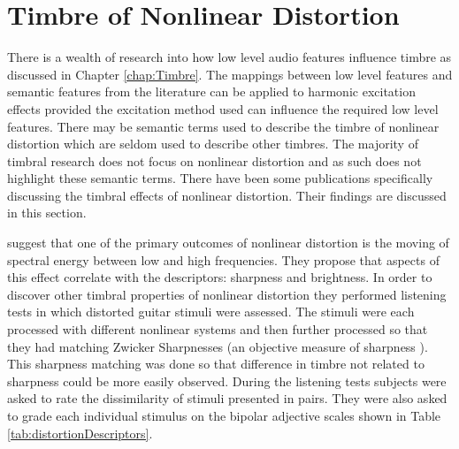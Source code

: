 \section{Timbre of Nonlinear Distortion}
\label{sec:Excitation-Timbre}
	There is a wealth of research into how low level audio features influence timbre as discussed in Chapter
	\ref{chap:Timbre}. The mappings between low level features and semantic features from the literature can be applied
	to harmonic excitation effects provided the excitation method used can influence the required low level features.
	There may be semantic terms used to describe the timbre of nonlinear distortion which are seldom used to describe
	other timbres. The majority of timbral research does not focus on nonlinear distortion and as such does not
	highlight these semantic terms. There have been some publications specifically discussing the timbral effects of
	nonlinear distortion. Their findings are discussed in this section.

	\citet{marui2005predicting} suggest that one of the primary outcomes of nonlinear distortion is the moving of
	spectral energy between low and high frequencies. They propose that aspects of this effect correlate with the
	descriptors: sharpness and brightness. In order to discover other timbral properties of nonlinear distortion they
	performed listening tests in which distorted guitar stimuli were assessed. The stimuli were each processed with
	different nonlinear systems and then further processed so that they had matching Zwicker Sharpnesses (an objective
	measure of sharpness \cite{fastl2007psychoacoustics}). This sharpness matching was done so that difference in
	timbre not related to sharpness could be more easily observed. During the listening tests subjects were asked to
	rate the dissimilarity of stimuli presented in pairs. They were also asked to grade each individual stimulus on the
	bipolar adjective scales shown in Table \ref{tab:distortionDescriptors}.

